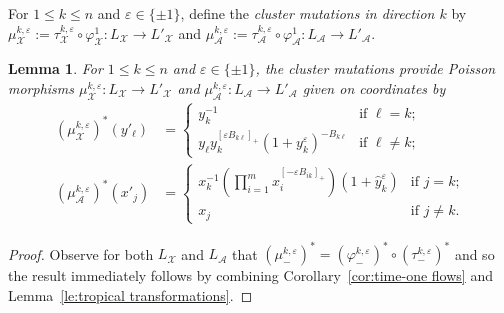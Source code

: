 \documentclass{amsart}
\newtheorem{lemma}[theorem]{Lemma}
\numberwithin{equation}{section}
\newcommand{\cA}{\mathcal{A}}
\newcommand{\cX}{\mathcal{X}}
\begin{document}
For $1\le k\le n$ and $\varepsilon\in\{\pm1\}$, define the \emph{cluster mutations in direction $k$} by $\mu_\cX^{k,\varepsilon}:=\tau_\cX^{k,\varepsilon}\circ\varphi_\cX^1:L_\cX\to L'_\cX$ and $\mu_\cA^{k,\varepsilon}:=\tau_\cA^{k,\varepsilon}\circ\varphi_\cA^1:L_\cA\to L'_\cA$.
\begin{lemma}
  \label{le:cluster mutation}
  For $1\le k\le n$ and $\varepsilon\in\{\pm1\}$, the cluster mutations provide Poisson morphisms $\mu_\cX^{k,\varepsilon}:L_\cX\to L'_\cX$ and $\mu_\cA^{k,\varepsilon}:L_\cA\to L'_\cA$ given on coordinates by
  \begin{align}
    \label{eq:X mutation}
    (\mu_\cX^{k,\varepsilon})^*(y'_\ell)&=\begin{cases} y_k^{-1} & \text{if $\ell=k$;}\\ y_\ell y_k^{[\varepsilon B_{k\ell}]_+}(1+y_k^\varepsilon)^{-B_{k\ell}} & \text{if $\ell\ne k$;}\end{cases}\\
    \label{eq:A mutation}
    (\mu_\cA^{k,\varepsilon})^*(x'_j)&=\begin{cases} x_k^{-1}\left(\prod\limits_{i=1}^m x_i^{[-\varepsilon B_{ik}]_+}\right)(1+\hat y_k^\varepsilon) & \text{if $j=k$;}\\ x_j & \text{if $j\ne k$.}\end{cases}
  \end{align}
\end{lemma}
\begin{proof}
  Observe for both $L_\cX$ and $L_\cA$ that $(\mu_-^{k,\varepsilon})^*=(\varphi_-^{k,\varepsilon})^*\circ(\tau_-^{k,\varepsilon})^*$ and so the result immediately follows by combining Corollary~\ref{cor:time-one flows} and Lemma~\ref{le:tropical transformations}.
\end{proof}
\end{document}
